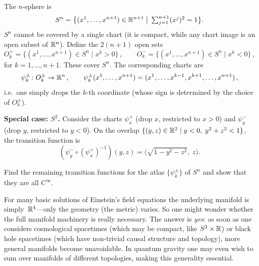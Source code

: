 The $n$-sphere is
\begin{equation}\label{eq:Sn-def}
  S^n = \bigl\{(x^1,\dots,x^{n+1})\in\mathbb{R}^{n+1}
    \;\big|\; \textstyle\sum_{j=1}^{n+1}(x^j)^2 = 1\bigr\}.
\end{equation}
$S^n$ cannot be covered by a single chart (it is compact, while
any chart image is an open subset of $\mathbb{R}^{n}$).
Define the $2(n{+}1)$ open sets
\begin{equation}\label{eq:Sn-open-sets}
  O_k^+ = \{(x^1,\dots,x^{n+1})\in S^n \mid x^k > 0\}\,,
  \qquad
  O_k^- = \{(x^1,\dots,x^{n+1})\in S^n \mid x^k < 0\}\,,
\end{equation}
for $k = 1,\dots,n{+}1$.
These cover $S^n$.  The corresponding charts are
\begin{equation}\label{eq:Sn-charts}
  \psi_k^\pm \colon O_k^\pm \to \mathbb{R}^{n}\,,
  \qquad
  \psi_k^\pm(x^1,\dots,x^{n+1})
    = (x^1,\dots,x^{k-1},x^{k+1},\dots,x^{n+1})\,,
\end{equation}
i.e.\ one simply drops the $k$-th coordinate (whose sign is
determined by the choice of $O_k^\pm$).

\medskip
\noindent\textbf{Special case: $S^2$.}\quad
Consider the charts $\psi_x^+$ (drop $x$, restricted to $x>0$)
and $\psi_y^-$ (drop $y$, restricted to $y<0$).
On the overlap $\{(y,z)\in\mathbb{R}^{2} \mid y<0,\; y^2+z^2<1\}$, the
transition function is
\[
  (\psi_y^-\circ(\psi_x^+)^{-1})(y,z)
    = \bigl(\sqrt{1-y^2-z^2},\; z\bigr).
\]



\begin{exercise}\label{ex:Sn-transitions}
  Find the remaining transition functions for the atlas
  $\{\psi_k^\pm\}$ of $S^n$ and show that they are all $C^\infty$.
\end{exercise}

\begin{intuition}
  For many basic solutions of Einstein's field equations the
  underlying manifold is simply~$\mathbb{R}^{4}$---only the geometry
  (the metric) varies.  So one might wonder whether the full
  manifold machinery is really necessary.
  The answer is \emph{yes}: as soon as one considers cosmological
  spacetimes (which may be compact, like $S^3\times\mathbb{R}$) or black
  hole spacetimes (which have non-trivial causal structure and
  topology), more general manifolds become unavoidable.
  In quantum gravity one may even wish to sum over manifolds of
  different topologies, making this generality essential.
\end{intuition}


